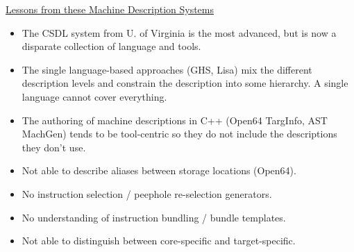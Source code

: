 \documentclass[a4]{seminar}
\begin{document}
\begin{slide}

\begin{center} \underline{Lessons from these Machine Description Systems}
\end{center}

\begin{itemize}

\item The CSDL system from U. of Virginia is the most advanced, but is now a
disparate collection of language and tools.

\item The single language-based approaches (GHS, Lisa) mix the different
description levels and constrain the description into some hierarchy. A single
language cannot cover everything.

\item The authoring of machine descriptions in C++ (Open64 TargInfo, AST MachGen)
tends to be tool-centric so they do not include the descriptions they don't use.

\item Not able to describe aliases between storage locations (Open64).

\item No instruction selection / peephole re-selection generators.

\item No understanding of instruction bundling / bundle templates.

\item Not able to distinguish between core-specific and target-specific.

\end{itemize}

\end{slide}
\end{document}
